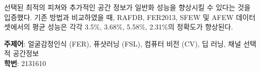 선택된 최적의 피쳐와 추가적인 공간 정보가 일반화 성능을 향상시킬 수 있다는 것을 입증했다. 기존 방법과 비교하였을 때, RAFDB, FER2013, SFEW 및 AFEW 데이터셋에서의 평균 성능은 각각 3.5\%, 3.68\%, 5.58\%, 2.31\%의 정확도가 향상된다.




\vfill
\begin{flushleft}
\begin{minipage}[t][20mm][b]{0.8\textwidth}
\noindent\makebox[\linewidth]{\rule{\linewidth}{1pt}}
{\bfseries 주제어}: 얼굴감정인식 (FER), 퓨샷러닝 (FSL), 컴퓨터 비전 (CV), 딥 러닝, 채널 선택적 공간정보\\
{\bfseries 학번}: 2131610\\
\end{minipage}
\end{flushleft}